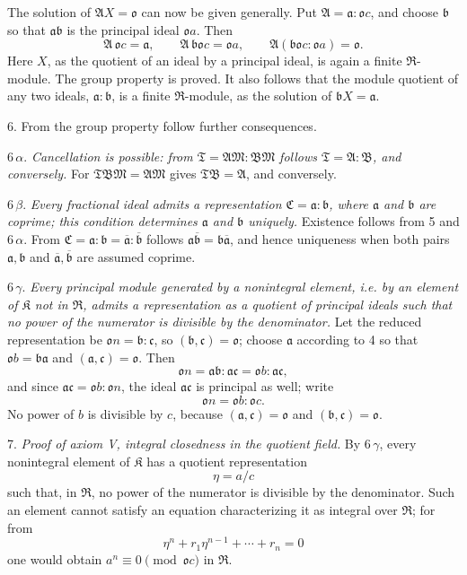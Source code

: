 \documentclass[11pt]{article}
\providecommand{\mR}{\mathfrak{R}}
\providecommand{\mK}{\mathfrak{K}}
\providecommand{\ma}{\mathfrak{a}}
\providecommand{\mb}{\mathfrak{b}}
\providecommand{\mc}{\mathfrak{c}}
\providecommand{\mo}{\mathfrak{o}}
\providecommand{\mbar}[1]{\overline{#1}}
\begin{document}
The solution of $\mathfrak A X=\mo$ can now be given generally. Put $\mathfrak A=\ma:\mo c$, and choose $\mb$ so that $\ma\mb$ is the principal ideal $\mo a$. Then
\[
        \mathfrak A\,\mo c=\ma,
        \qquad \mathfrak A\,\mb\mo c=\mo a,
        \qquad \mathfrak A(\mb\mo c:\mo a)=\mo.
\]
Here $X$, as the quotient of an ideal by a principal ideal, is again a finite $\mR$-module. The group property is proved. It also follows that the module quotient of any two ideals, $\ma:\mb$, is a finite $\mR$-module, as the solution of $\mb X=\ma$.

6. From the group property follow further consequences.

6\,$\alpha$. \emph{Cancellation is possible: from $\mathfrak T=\mathfrak A\mathfrak M:\mathfrak B\mathfrak M$ follows $\mathfrak T=\mathfrak A:\mathfrak B$, and conversely.} For $\mathfrak T\mathfrak B\mathfrak M=\mathfrak A\mathfrak M$ gives $\mathfrak T\mathfrak B=\mathfrak A$, and conversely.

6\,$\beta$. \emph{Every fractional ideal admits a representation $\mathfrak C=\ma:\mb$, where $\ma$ and $\mb$ are coprime; this condition determines $\ma$ and $\mb$ uniquely.} Existence follows from 5 and 6\,$\alpha$. From $\mathfrak C=\ma:\mb=\mbar\ma:\mbar\mb$ follows $\ma\mbar\mb=\mb\mbar\ma$, and hence uniqueness when both pairs $\ma,\mb$ and $\mbar\ma,\mbar\mb$ are assumed coprime.

6\,$\gamma$. \emph{Every principal module generated by a nonintegral element, i.e. by an element of $\mK$ not in $\mR$, admits a representation as a quotient of principal ideals such that no power of the numerator is divisible by the denominator.} Let the reduced representation be $\mo n=\mb:\mc$, so $(\mb,\mc)=\mo$; choose $\ma$ according to 4 so that $\mo b=\mb\ma$ and $(\ma,\mc)=\mo$. Then
\[
        \mo n=\ma\mb:\ma\mc=\mo b:\ma\mc,
\]
and since $\ma\mc=\mo b:\mo n$, the ideal $\ma\mc$ is principal as well; write
\[
        \mo n=\mo b:\mo c.
\]
No power of $b$ is divisible by $c$, because $(\ma,\mc)=\mo$ and $(\mb,\mc)=\mo$.

7. \emph{Proof of axiom V, integral closedness in the quotient field.} By 6\,$\gamma$, every nonintegral element of $\mK$ has a quotient representation
\[
        \eta=a/c
\]
such that, in $\mR$, no power of the numerator is divisible by the denominator. Such an element cannot satisfy an equation characterizing it as integral over $\mR$; for from
\[
        \eta^n+r_1\eta^{n-1}+\cdots+r_n=0
\]
one would obtain $a^n\equiv0\pmod{\mo c}$ in $\mR$.
\end{document}

